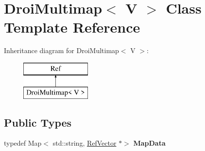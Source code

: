 \hypertarget{class_droi_multimap}{}\section{Droi\+Multimap$<$ V $>$ Class Template Reference}
\label{class_droi_multimap}
Inheritance diagram for Droi\+Multimap$<$ V $>$\+:\begin{figure}[H]
\begin{center}
\leavevmode
\includegraphics[height=2.000000cm]{d6/de7/class_droi_multimap}
\end{center}
\end{figure}
\subsection*{Public Types}
\begin{DoxyCompactItemize}
\item 
\mbox{\label{class_droi_multimap_a04baafc91f823a7416813f582916f925}} 
typedef Map$<$ std\+::string, \hyperlink{class_ref_vector}{Ref\+Vector} $\ast$$>$ {\bfseries Map\+Data}
\end{DoxyCompactItemize}
